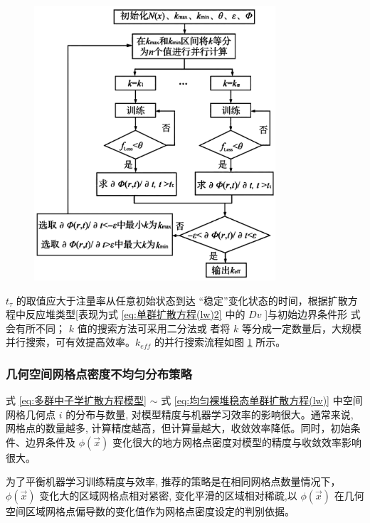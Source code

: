 \documentclass{Sichuan Normal University}
\begin{document}
\begin{figure}[H]
    \centering
    \includegraphics[width=0.8\textwidth]{./figure/k_eff并行搜索流程图.png} %
    \label{fig:k_eff并行搜索流程图}
\end{figure}


$t_\tau$ 的取值应大于注量率从任意初始状态到达 “稳定”变化状态的时间，根据扩散方程中反应堆类型[表现为式 \eqref{eq:单群扩散方程(lw)2} 中的 $Dv$ ]与初始边界条件形 式会有所不同；
$k$ 值的搜索方法可采用二分法或 者将 $k$ 等分成一定数量后，大规模并行搜索，可有效提高效率。$k_{eff}$ 的并行搜索流程如图 \ref{fig:k_eff并行搜索流程图} 所示。

\subsubsection{几何空间网格点密度不均匀分布策略}
式 \eqref{eq:多群中子学扩散方程模型}  $\sim$ 式 \eqref{eq:均匀裸堆稳态单群扩散方程(lw)} 中空间网格几何点 $i$ 的分布与数量, 对模型精度与机器学习效率的影响很大。通常来说, 网格点的数量越多, 计算精度越高，但计算量越大，收敛效率降低。同时，初始条件、边界条件及 $\phi(\vec{x})$ 变化很大的地方网格点密度对模型的精度与收敛效率影响很大。

为了平衡机器学习训练精度与效率, 推荐的策略是在相同网格点数量情况下， $\phi(\vec{x})$ 变化大的区域网格点相对紧密, 变化平滑的区域相对稀疏,以 $\phi(\vec{x})$ 在几何空间区域网格点偏导数的变化值作为网格点密度设定的判别依据。
\end{document}
